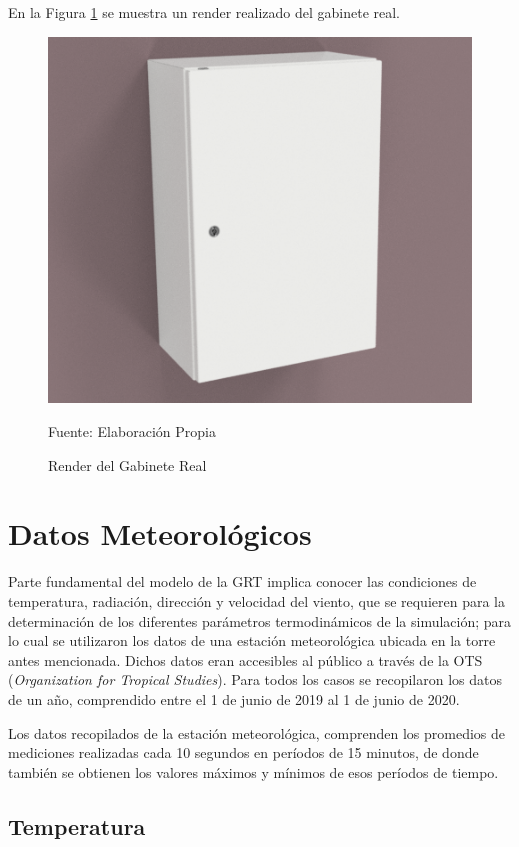 En la Figura \ref{gabinete1} se muestra un render realizado del gabinete real.

\begin{figure}[H]
\centering
\includegraphics[scale=0.65]{Figuras/gabinete1.png}
\caption{Render del Gabinete Real}
Fuente: Elaboración Propia
\label{gabinete1}
\end{figure}

\section{Datos Meteorológicos}

Parte fundamental del modelo de la GRT implica conocer las condiciones de temperatura, radiación, dirección y velocidad del viento, que se requieren para la determinación de los diferentes parámetros termodinámicos de la simulación; para lo cual se utilizaron los datos de una estación meteorológica ubicada en la torre antes mencionada. Dichos datos eran accesibles al público a través de la OTS (\textit{Organization for Tropical Studies})\cite{ots}. Para todos los casos se recopilaron los datos de un año, comprendido entre el 1 de junio de 2019 al 1 de junio de 2020.

Los datos recopilados de la estación meteorológica, comprenden los promedios de mediciones realizadas cada 10 segundos en períodos de 15 minutos, de donde también se obtienen los valores máximos y mínimos de esos períodos de tiempo. \cite{ots}

\subsection{Temperatura}

